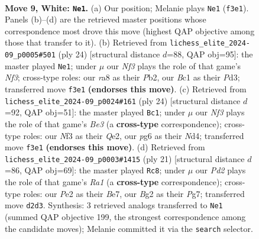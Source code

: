 \documentclass[11pt]{article}
\begin{document}
\clearpage

\begin{figure}[p]\centering
\begin{subfigure}{0.46\textwidth}\centering
\resizebox{\linewidth}{!}{%
\newchessgame
\chessboard[
  setfen={r1bq1r1k/pp1pppbp/5np1/2p5/2Pn4/2N2NP1/PP1PPPBP/R1BQ1RK1 w - - 8 9},
  showmover=false,
  pgfstyle=straightmove, color=movearrow, markmove={f3-e1}
]}
\caption{}
\end{subfigure}\hfill
\begin{subfigure}{0.46\textwidth}\centering
\resizebox{\linewidth}{!}{%
\newchessgame
\chessboard[
  setfen={2rq1rk1/pp2bppp/2b1pn2/2p5/3n1B2/2NP1NP1/PP2PPBP/R2Q1RK1 w - - 7 13},
  showmover=false,
  pgfstyle=straightmove, color=movearrow, markmove={f3-e1}
]}
\caption{}
\end{subfigure}
\\[4pt]
\begin{subfigure}{0.46\textwidth}\centering
\resizebox{\linewidth}{!}{%
\newchessgame
\chessboard[
  setfen={r1b2rk1/1pq1bppp/p2ppn2/8/2nNP3/2N1B1P1/PPP1QPBP/R4RK1 w - - 3 13},
  showmover=false,
  pgfstyle=straightmove, color=movearrow, markmove={e3-c1}
]}
\caption{}
\end{subfigure}\hfill
\begin{subfigure}{0.46\textwidth}\centering
\resizebox{\linewidth}{!}{%
\newchessgame
\chessboard[
  setfen={r2q1rk1/1p2bppp/p1npbn2/3Np3/4P3/3B2N1/PPP2PPP/R1BQR1K1 b - - 9 11},
  showmover=false,
  pgfstyle=straightmove, color=movearrow, markmove={a8-c8}
]}
\caption{}
\end{subfigure}
\caption{\textbf{Move 9, White: \texttt{Ne1}.} (a) Our position; Melanie plays \texttt{Ne1} (\texttt{f3e1}). Panels (b)--(d) are the retrieved master positions whose correspondence most drove this move (highest QAP objective among those that transfer to it). (b) Retrieved from \texttt{lichess\_elite\_2024-09\_p0005\#501} (ply 24) [structural distance $d$=88, QAP obj=95]: the master played \texttt{Ne1}; under $\mu$ our \emph{Nf3} plays the role of that game's \emph{Nf3}; cross-type roles: our \emph{r}a8 as their \emph{P}b2, our \emph{B}c1 as their \emph{P}d3; transferred move \texttt{f3e1} \textbf{(endorses this move)}. (c) Retrieved from \texttt{lichess\_elite\_2024-09\_p0024\#161} (ply 24) [structural distance $d$=92, QAP obj=51]: the master played \texttt{Bc1}; under $\mu$ our \emph{Nf3} plays the role of that game's \emph{Be3} (a \textbf{cross-type} correspondence); cross-type roles: our \emph{N}f3 as their \emph{Q}e2, our \emph{p}g6 as their \emph{N}d4; transferred move \texttt{f3e1} \textbf{(endorses this move)}. (d) Retrieved from \texttt{lichess\_elite\_2024-09\_p0003\#1415} (ply 21) [structural distance $d$=86, QAP obj=69]: the master played \texttt{Rc8}; under $\mu$ our \emph{Pd2} plays the role of that game's \emph{Ra1} (a \textbf{cross-type} correspondence); cross-type roles: our \emph{P}e2 as their \emph{B}e7, our \emph{B}g2 as their \emph{P}g7; transferred move \texttt{d2d3}. Synthesis: 3 retrieved analogs transferred to \texttt{Ne1} (summed QAP objective 199, the strongest correspondence among the candidate moves); Melanie committed it via the \texttt{search} selector.}
\label{fig:thought-m16}
\end{figure}
\end{document}
